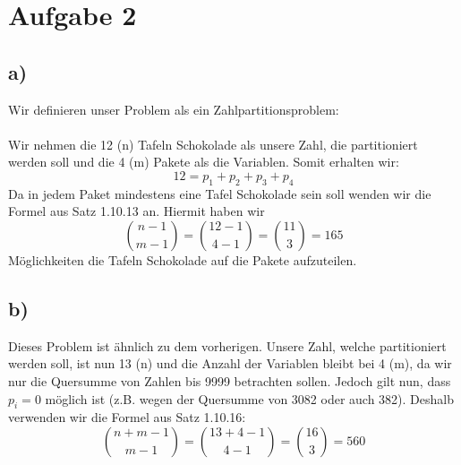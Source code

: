 \section*{Aufgabe 2}
\subsection*{a)}
Wir definieren unser Problem als ein Zahlpartitionsproblem: \\\\
Wir nehmen die 12 (n) Tafeln Schokolade als unsere Zahl, die partitioniert werden soll und die 4 (m) Pakete als die Variablen. Somit erhalten wir:
\[
  12 = p_1 + p_2 + p_3 + p_4
\]
Da in jedem Paket mindestens eine Tafel Schokolade sein soll wenden wir die Formel aus Satz 1.10.13 an. Hiermit haben wir
\[
  \binom{n-1}{m-1} = \binom{12 - 1}{4 - 1} = \binom{11}{3} = 165
\]
Möglichkeiten die Tafeln Schokolade auf die Pakete aufzuteilen.

\subsection*{b)}
Dieses Problem ist ähnlich zu dem vorherigen. Unsere Zahl, welche partitioniert werden soll, ist nun 13 (n) und die Anzahl der Variablen bleibt bei 4 (m), da wir nur die Quersumme von Zahlen bis 9999 betrachten sollen. Jedoch gilt nun, dass $p_i = 0$ möglich ist (z.B. wegen der Quersumme von 3082 oder auch 382). Deshalb verwenden wir die Formel aus Satz 1.10.16:
\[
  \binom{n+m-1}{m-1} = \binom{13 + 4 - 1}{4 - 1} = \binom{16}{3} = 560
\]